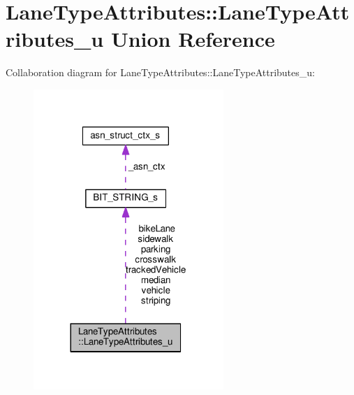 \hypertarget{unionLaneTypeAttributes_1_1LaneTypeAttributes__u}{}\section{Lane\+Type\+Attributes\+:\+:Lane\+Type\+Attributes\+\_\+u Union Reference}
\label{unionLaneTypeAttributes_1_1LaneTypeAttributes__u}


Collaboration diagram for Lane\+Type\+Attributes\+:\+:Lane\+Type\+Attributes\+\_\+u\+:\nopagebreak
\begin{figure}[H]
\begin{center}
\leavevmode
\includegraphics[width=204pt]{unionLaneTypeAttributes_1_1LaneTypeAttributes__u__coll__graph}
\end{center}
\end{figure}
